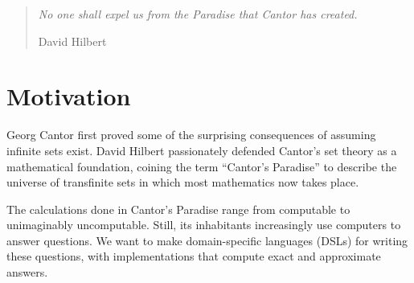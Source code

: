
\newcommand{\ftargetlang}{\ensuremath{\lambda_{\mathrm{ZFC}}^-}\xspace}

\theoremstyle{definition}
\newtheorem{axiom}{Axiom}

\begin{comment}
\begin{abstract}
Applied mathematicians increasingly use computers to answer mathematical questions. We want to provide them domain-specific languages.
The languages should have exact meanings and computational meanings.
Some proof assistants can encode exact mathematics and extract programs, but formalizing the required theorems can take years.

As an alternative, we develop \targetlang, a lambda calculus that contains infinite sets as values, in which to express exact mathematics and gradually change infinite calculations to computable ones. We define it as a conservative extension of set theory, and prove that most contemporary theorems apply directly to \targetlang terms.

We demonstrate \targetlang's expressiveness by coding up the real numbers, arithmetic and limits. We demonstrate that it makes deriving computational meaning easier by defining a monad in it for expressing limits, and using standard topological theorems to derive a computable replacement.
\end{abstract}
\keywords Lambda Calculus, Set Theory, Semantics
\end{comment}

\begin{quote}
\textit{No one shall expel us from the Paradise that Cantor has created.}

\hfill David Hilbert
\end{quote}

\section{Motivation}

Georg Cantor first proved some of the surprising consequences of assuming infinite sets exist.
David Hilbert passionately defended Cantor's set theory as a mathematical foundation, coining the term ``Cantor's Paradise'' to describe the universe of transfinite sets in which most mathematics now takes place.

The calculations done in Cantor's Paradise range from computable to unimaginably uncomputable. Still, its inhabitants increasingly use computers to answer questions. We want to make domain-specific languages (DSLs) for writing these questions, with implementations that compute exact and approximate answers.

